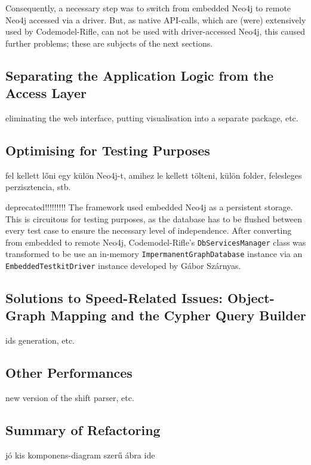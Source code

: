 Consequently, a necessary step was to switch from embedded Neo4j to remote Neo4j accessed via a driver. But, as native API-calls, which are (were) extensively used by Codemodel-Rifle, can not be used with driver-accessed Neo4j, this caused further problems; these are subjects of the next sections.


\subsection{Separating the Application Logic from the Access Layer}

eliminating the web interface, putting visualisation into a separate package, etc.


\subsection{Optimising for Testing Purposes}

fel kellett lőni egy külön Neo4j-t, amihez le kellett tölteni, külön folder, felesleges perzisztencia, stb.

deprecated!!!!!!!!! The framework used embedded Neo4j as a persistent storage. This is circuitous for testing purposes, as the database has to be flushed between every test case to ensure the necessary level of independence. After converting from embedded to remote Neo4j, Codemodel-Rifle's \texttt{DbServicesManager} class was transformed to be use an in-memory \texttt{ImpermanentGraphDatabase} instance via an \texttt{EmbeddedTestkitDriver} instance developed by Gábor Szárnyas.~\cite{neo4j-drivers}


\subsection{Solutions to Speed-Related Issues: Object-Graph Mapping and the Cypher Query Builder}

ids generation, etc.


\subsection{Other Performances}

new version of the shift parser, etc.


\subsection{Summary of Refactoring}

jó kis komponens-diagram szerű ábra ide


